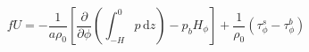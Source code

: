 \begin{equation}
    fU = -\frac{1}{a\rho_0}\left[\frac{\partial}{\partial \phi}\left(\int_{-H}^0p\,\text{d}z\right)-p_b H_\phi\right]+\frac{1}{\rho_0}\left(\tau_\phi^s-\tau_\phi^b\right)
\label{EQN:VIntV}
\end{equation}
